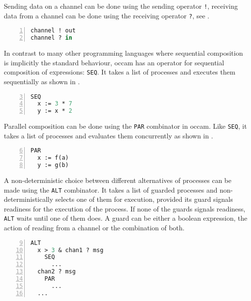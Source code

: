 Sending data on a channel can be done using the sending operator \texttt{!}, receiving data from a channel can be done using the receiving operator \texttt{?}, see .

\begin{lstlisting}[language=Caml, caption=Sending data over a channel and receiving data from a channel in \textsf{occam}., label=lst:occam_send_receive, numbers=left, frame=bt]
channel ! out
channel ? in
\end{lstlisting}

In contrast to many other programming languages where sequential composition is implicitly the standard behaviour, \textsf{occam} has an operator for sequential composition of expressions: \texttt{SEQ}. It takes a list of processes and executes them sequentially as shown in .

\begin{lstlisting}[language=Caml, caption=Sequential composition of processes in \textsf{occam}., label=lst:occam_seq, numbers=left, frame=bt, firstnumber=3]
SEQ
  x := 3 * 7
  y := x * 2
\end{lstlisting}

Parallel composition can be done using the \texttt{PAR} combinator in \textsf{occam}. Like \texttt{SEQ}, it takes a list of processes and evaluates them concurrently as shown in .

\begin{lstlisting}[language=Caml, caption=Parallel composition of processes in \textsf{occam}., label=lst:occam_par, numbers=left, frame=bt, firstnumber=6]
PAR
  x := f(a)
  y := g(b)
\end{lstlisting}

A non-deterministic choice between different alternatives of processes can be made using the \texttt{ALT} combinator. It takes a list of guarded processes and non-deterministically selects one of them for execution, provided its guard signals readiness for the execution of the process. If none of the guards signals readiness, \texttt{ALT} waits until one of them does. A guard can be either a boolean expression, the action of reading from a channel or the combination of both.

\begin{lstlisting}[language=Caml, caption=Choice between process alternatives in \textsf{occam}., label=lst:occam_par, numbers=left, frame=bt, firstnumber=9]
ALT
  x > 3 & chan1 ? msg
    SEQ
      ...
  chan2 ? msg
    PAR
      ...
  ...
\end{lstlisting}

